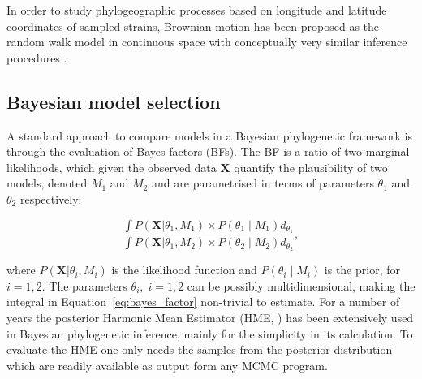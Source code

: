 In order to study phylogeographic processes based on longitude and latitude coordinates of sampled strains, Brownian motion has been proposed as the random walk model in continuous space with conceptually very similar inference procedures \citep{Lemey2010}.


\subsection{Bayesian model selection\label{sub:model_selection}}

A standard approach to compare models in a Bayesian phylogenetic framework is through the evaluation of Bayes factors (BFs).   
The BF is a ratio of two marginal likelihoods, which given the observed data $\mathbf{X}$ quantify the plausibility of two models, denoted $M_{1}$ and $M_{2}$ and are parametrised in terms of parameters $\theta_{1}$ and $\theta_{2}$ respectively:

% 
\begin{equation}  
\frac{\int P\left(\mathbf{X}|\theta_{1},M_{1}\right)\times P\left(\theta_{1} \mid M_{1}  \right)d_{\theta_{1}}}{\int P\left(\mathbf{X}|\theta_{1},M_{2}\right)\times P\left(\theta_{2} \mid M_{2} \right)d_{\theta_{2}}},
\label{eq:bayes_factor}
\end{equation}  
% 

\noindent
where $P\left(\mathbf{X}|\theta_{i},M_{i}\right)$ is the likelihood function and $P\left(\theta_{i} \mid M_{i} \right)$ is the prior, for $i=1, 2$.
The parameters $\theta_{i},\; i=1, 2$ can be possibly multidimensional, making the integral in Equation~\ref{eq:bayes_factor} non-trivial to estimate.
For a number of years the posterior Harmonic Mean Estimator (HME, \cite{Newton1994}) has been extensively used in Bayesian phylogenetic inference, mainly for the simplicity in its calculation. 
To evaluate the HME one only needs the samples from the posterior distribution which are readily available as output form any MCMC program.

